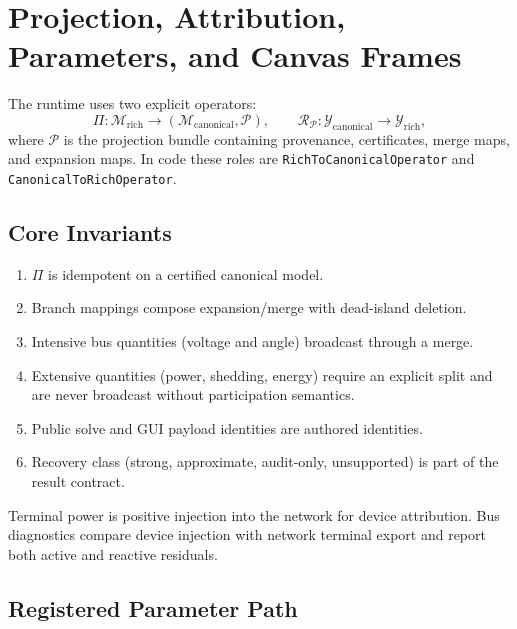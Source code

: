 \section{Projection, Attribution, Parameters, and Canvas Frames}
\label{sec:projection_result_contracts}

The runtime uses two explicit operators:
\[
  \Pi : \mathcal{M}_{\mathrm{rich}} \rightarrow
        (\mathcal{M}_{\mathrm{canonical}},\mathcal{P}),
  \qquad
  \mathcal{R}_{\mathcal{P}} : \mathcal{Y}_{\mathrm{canonical}}
        \rightarrow \mathcal{Y}_{\mathrm{rich}},
\]
where \(\mathcal{P}\) is the projection bundle containing provenance,
certificates, merge maps, and expansion maps.  In code these roles are
\texttt{RichToCanonicalOperator} and \texttt{CanonicalToRichOperator}.

\subsection{Core Invariants}

\begin{enumerate}
  \item \(\Pi\) is idempotent on a certified canonical model.
  \item Branch mappings compose expansion/merge with dead-island deletion.
  \item Intensive bus quantities (voltage and angle) broadcast through a merge.
  \item Extensive quantities (power, shedding, energy) require an explicit
        split and are never broadcast without participation semantics.
  \item Public solve and GUI payload identities are authored identities.
  \item Recovery class (strong, approximate, audit-only, unsupported) is part
        of the result contract.
\end{enumerate}

Terminal power is positive injection into the network for device attribution.
Bus diagnostics compare device injection with network terminal export and
report both active and reactive residuals.

\subsection{Registered Parameter Path}

